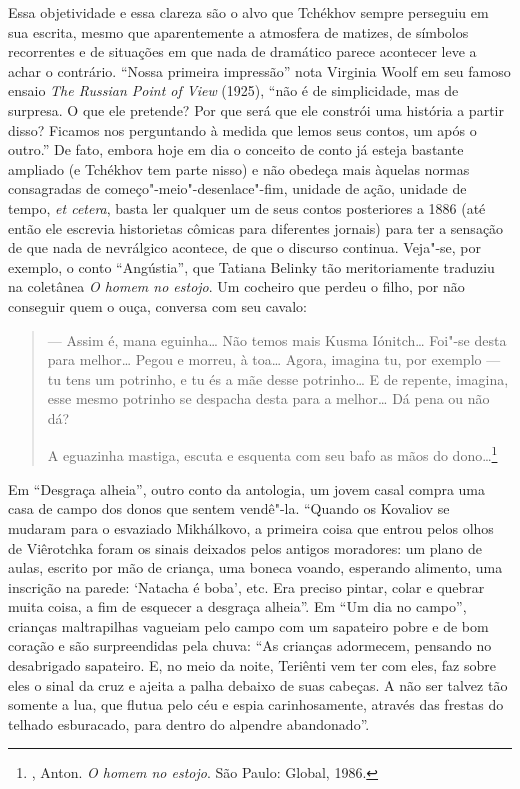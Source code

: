 Essa objetividade e essa clareza são o alvo que Tchékhov sempre
perseguiu em sua escrita, mesmo que aparentemente a atmosfera de
matizes, de símbolos recorrentes e de situações em que nada de
dramático parece acontecer leve a achar o contrário. ``Nossa
primeira impressão'' nota Virginia Woolf em seu famoso ensaio
\emph{The Russian Point of View} (1925), ``não é de simplicidade,
mas de surpresa. O que ele pretende? Por que será que ele constrói
uma história a partir disso? Ficamos nos perguntando à medida que
lemos seus contos, um após o outro.'' De fato, embora hoje em dia
o conceito de conto já esteja bastante ampliado (e
Tchékhov tem parte nisso) e não obedeça mais àquelas normas
consagradas de começo"-meio"-desenlace"-fim, unidade de ação,
unidade de tempo, \emph{et cetera}, basta ler qualquer um de
seus contos posteriores a 1886 (até então ele escrevia historietas
cômicas para diferentes jornais) para ter a sensação de que nada
de nevrálgico acontece, de que o discurso continua. Veja"-se, por
exemplo, o conto ``Angústia'', que Tatiana Belinky tão meritoriamente
traduziu na coletânea \emph{O homem no estojo}. Um cocheiro que
perdeu o filho, por não conseguir quem o ouça, conversa com seu
cavalo: 

\begin{quotation}
--- Assim é, mana eguinha\ldots{} Não temos mais Kusma
Iónitch\ldots{} Foi"-se desta para melhor\ldots{} Pegou e morreu,
à toa\ldots{} Agora, imagina tu, por exemplo --- tu tens um
potrinho, e tu és a mãe desse potrinho\ldots{} E de repente,
imagina, esse mesmo potrinho se despacha desta para a melhor\ldots{}
Dá pena ou não dá?

A eguazinha mastiga, escuta e esquenta com seu bafo as mãos do
dono\ldots{}\footnote{, Anton. \emph{O homem no
estojo}. São Paulo: Global, 1986.}
\end{quotation}

Em ``Desgraça alheia'', outro conto da antologia, um jovem casal
compra uma casa de campo dos donos que sentem vendê"-la. ``Quando
os Kovaliov se mudaram para o esvaziado Mikhálkovo, a primeira
coisa que entrou pelos olhos de Viêrotchka foram os sinais
deixados pelos antigos moradores: um plano de aulas, escrito por
mão de criança, uma boneca voando, esperando alimento, uma
inscrição na parede: `Natacha é boba', etc. Era preciso pintar,
colar e quebrar muita coisa, a fim de esquecer a desgraça alheia''.
Em ``Um dia no campo'', crianças maltrapilhas vagueiam pelo campo
com um sapateiro pobre e de bom coração e são surpreendidas pela
chuva: ``As crianças adormecem, pensando no desabrigado sapateiro.
E, no meio da noite, Teriênti vem ter com eles, faz sobre eles o
sinal da cruz e ajeita a palha debaixo de suas cabeças. A não ser
talvez tão somente a lua, que flutua pelo céu e espia carinhosamente,
através das frestas do telhado esburacado, para dentro do alpendre
abandonado''.

